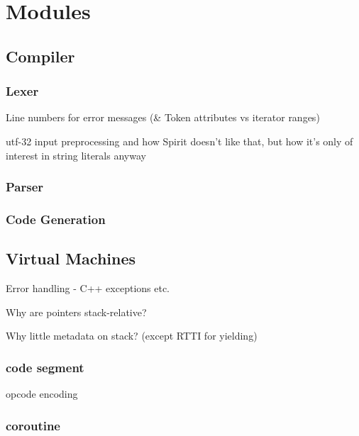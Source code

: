     
    \section{Modules}
    
    
        \subsection{Compiler}
        
            \subsubsection{Lexer}
            Line numbers for error messages (\& Token attributes vs iterator ranges)
            
            utf-32 input preprocessing and how Spirit doesn't like that, but how it's only of interest in string literals anyway
            
            \subsubsection{Parser}
            
            \subsubsection{Code Generation}
            
        \subsection{Virtual Machines}
        
            Error handling - C++ exceptions etc.
            
            Why are pointers stack-relative?
            
            Why little metadata on stack? (except RTTI for yielding)
            
            \subsubsection{code segment}
                opcode encoding
            \subsubsection{coroutine}
